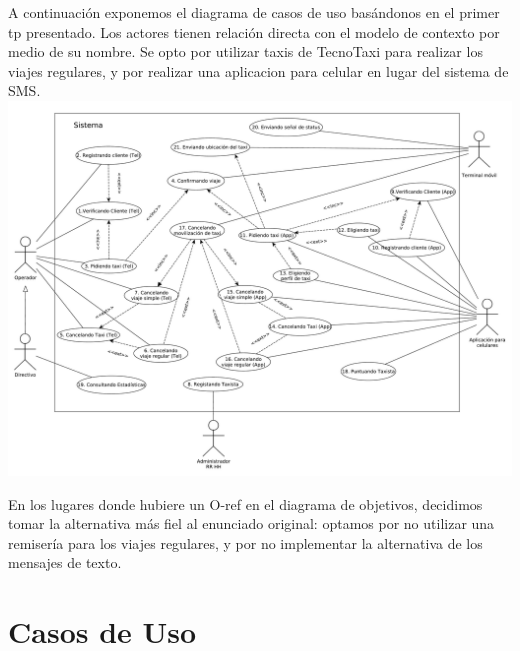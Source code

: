 \documentclass[a4paper]{article}
\begin{document}
A continuaci\'on exponemos el diagrama de casos de uso bas\'andonos en el primer tp presentado. 
Los actores tienen relaci\'on directa con el modelo de contexto por medio de su nombre.
Se opto por utilizar taxis de TecnoTaxi para realizar los viajes regulares, y por realizar una aplicacion para celular en lugar del sistema
de SMS.
\\
\includegraphics[scale=0.38]{diag_CasosDeUso.pdf}

En los lugares donde hubiere un O-ref en el diagrama de objetivos, decidimos tomar la alternativa m\'as fiel al enunciado original: optamos por no utilizar una remiser\'ia para los viajes regulares, y por no implementar la alternativa de los mensajes de texto.
\section{Casos de Uso}
\end{document}
